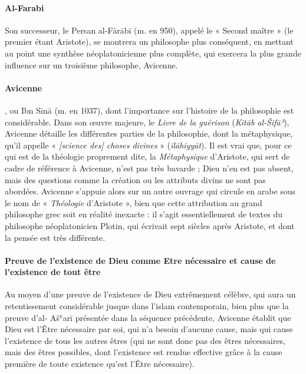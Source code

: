 \paragraph{Al-Farabi} \label{Theo:AlFarabi1}Son successeur, le Persan al-Fārābī (m. en 950), appelé le « Second
maître » (le premier étant Aristote), se montrera un philosophe plus
conséquent, en mettant au point une synthèse néoplatonicienne plus
complète, qui exercera la plus grande influence sur un troisième
philosophe, Avicenne.
\paragraph{Avicenne}, \label{Theo:Avicenne1} ou Ibn Sīnā (m. en 1037), dont l'importance sur
l'histoire de la philosophie est considérable. Dans son œuvre majeure,
le \emph{Livre de la guérison} (\emph{Kitāb al-Šifāʾ}), Avicenne
détaille les différentes parties de la philosophie, dont la
métaphysique, qu'il appelle
« \textit{{[}science des{]} choses divines} » (\emph{ilāhiyyāt}). Il est vrai
que, pour ce qui est de la théologie proprement dite, la
\emph{Métaphysique} d'Aristote, qui sert de cadre de référence à
Avicenne, n'est
pas très bavarde ; Dieu n'en est pas absent, mais des questions comme la
création ou les attributs divins ne sont pas abordées. Avicenne s'appuie
alors sur un autre ouvrage qui circule en arabe sous le nom de «
\emph{Théologie} d'Aristote », bien que cette attribution au grand
philosophe grec soit en réalité inexacte : il s'agit essentiellement de
textes du philosophe néoplatonicien Plotin, qui écrivait sept siècles
après Aristote, et dont la pensée est très différente.

\paragraph{Preuve de l'existence de Dieu comme Etre nécessaire et cause de l'existence de tout être}
Au moyen d'une preuve de l'existence de Dieu extrêmement célèbre, qui
aura un retentissement considérable jusque dans l'islam contemporain,
bien plus que la preuve d'al- Ašʿarī présentée dans la séquence
précédente, Avicenne établit que Dieu est l'Être nécessaire par soi, qui
n'a besoin d'aucune cause, mais qui cause l'existence de tous les autres
êtres (qui ne sont donc pas des êtres nécessaires, mais des êtres
possibles, dont l'existence est rendue effective grâce à la cause
première de toute existence qu'est l'Être nécessaire).

